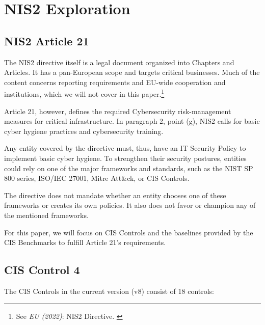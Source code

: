 %
%

\pagebreak
\section{NIS2 Exploration}

\onehalfspacing

\subsection{NIS2 Article 21}

The NIS2 directive itself is a legal document organized into Chapters and Articles. It has a pan-European scope and targets critical businesses. Much of the content concerns reporting requirements and EU-wide cooperation and institutions, which we will not cover in this paper.\footnote{See \textit{EU (2022)}: NIS2 Directive. \cite{nis2}}

Article 21, however, defines the required Cybersecurity risk-management measures for critical infrastructure. In paragraph 2, point (g), NIS2 calls for basic cyber hygiene practices and cybersecurity training.

Any entity covered by the directive must, thus, have an IT Security Policy to implement basic cyber hygiene. To strengthen their security postures, entities could rely on one of the major frameworks and standards, such as the NIST SP 800 series, ISO/IEC 27001, Mitre Att\&ck, or CIS Controls.

The directive does not mandate whether an entity chooses one of these frameworks or creates its own policies. It also does not favor or champion any of the mentioned frameworks.

For this paper, we will focus on CIS Controls and the baselines provided by the CIS Benchmarks to fulfill Article 21's requirements.

\subsection{CIS Control 4}

The CIS Controls in the current version (v8) consist of 18 controls:

